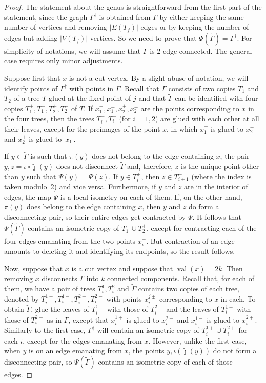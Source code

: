 \documentclass[11pt]{article}
\theoremstyle{definition}
\numberwithin{equation}{section}
\theoremstyle{definition}
\newcommand{\tj}{\widetilde{\jmath}}
\newcommand{\wt}[1]{\widetilde{#1}}
\DeclareMathOperator{\val}{val}
\begin{document}
    
    \begin{proof}
The statement about the genus is straightforward from the first part of the statement, since the graph $\Gamma^{\dagger}$ is obtained from $\Gamma$ by either keeping the same number of vertices and removing $|E(T_f)|$ edges or by keeping the number of edges but adding $|V(T_f)|$ vertices. 
So we need to prove that $\Psi(\wt\Gamma) = \Gamma^{\dagger}$. For simplicity of notations, we will assume that $\Gamma$ is 2-edge-connected. The general case requires only minor adjustments. 

Suppose first that $x$ is not a cut vertex. By a slight abuse of notation, we will identify points of $\Gamma^{\dagger}$ with points in $\Gamma$.
Recall that $\Gamma$ consists of two copies $T_1$ and $T_2$ of a tree $T$ glued at the fixed point of $j$ and that $\wt\Gamma$ can be identified with four copies $T_1^+,T_1^-,T_2^+,T_2^-$ of $T$. If $x_1^+, x_1^-,x_2^+,x_2^-$ are the points corresponding to $x$ in the four trees, then  the trees $T_i^+,T_i^-$ (for $i=1,2$) are glued with each other  at all  their leaves, except for the preimages of the point $x$, in which $x_1^+$ is glued to $x_2^-$ and $x_2^+$ is glued to~$x_1^-$.  

If $y\in\wt\Gamma$ is such that $\pi(y)$ does not belong to the edge containing $x$, the pair $y,z=\iota\circ\tj(y)$ does not disconnect $\wt\Gamma$ and, therefore, $z$ is the unique point other than $y$ such that 
$\Psi(y)=\Psi(z)$. 
If $y\in T^+_i$, then $z\in T^-_{i+1}$ (where the index is taken modulo~2) and vice versa. Furthermore, if $y$ and $z$ are in the interior of edges, the map $\Psi$ is a local isometry on each of them. 
If, on the other hand, $\pi(y)$ does belong to the edge containing $x$, then $y$ and $z$ do form a disconnecting pair, so their entire edges get contracted by $\Psi$. 
It follows that $\Psi(\wt\Gamma)$ contains an isometric copy of $T_1^+\cup T_2^+$, except for contracting  each of the four edges emanating from the two points $x_i^{\pm}$. But contraction of an edge amounts to deleting it and identifying its endpoints, so the result follows. 

Now, suppose that $x$ is a cut vertex and suppose that $\val(x) = 2k$. Then removing $x$ disconnects $\Gamma$ into $k$ connected components. Recall that, for each of them, we have a pair of trees $T_i^1,T_i^2$ and $\wt\Gamma$ contains  two copies  of each tree, denoted by $T_i^{1+}, T_i^{1-}, T_i^{2+},T_i^{2-}$ with points $x_i^{j\pm}$ corresponding to $x$ in each. To obtain $\wt\Gamma$, glue the leaves of   $T_i^{1+}$ with those of $T_i^{2+}$ and the leaves of $T_i^{1-}$ with those of $T_i^{2-}$ as in $\Gamma$, except that $x_i^{1+}$ is glued to $x_i^{2-}$ and $x_i^{1-}$ is glued to $x_i^{2+}$.
Similarly to the first case, $\Gamma^{\dagger}$ will contain an isometric copy of $T_i^{1+}\cup T_i^{2+}$ for each $i$, except for the edges emanating from $x$. However, unlike the first case, when $y$ is on an edge emanating from $x$, the points $y,\iota(\tj (y))$ do not form a disconnecting pair, so $\Psi(\wt\Gamma)$ contains an isometric copy of each of those edges. 
    \end{proof}
\end{document}
